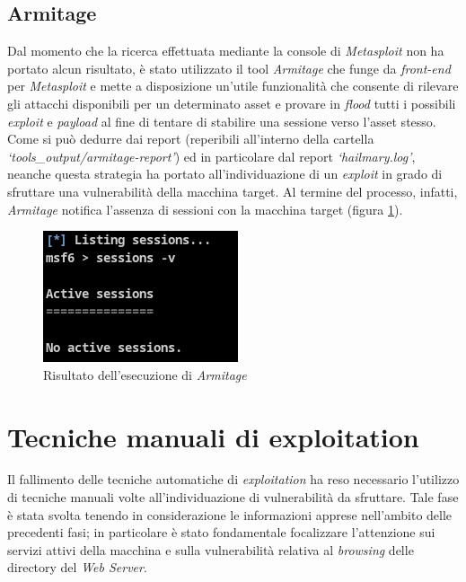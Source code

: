\subsection{Armitage}
Dal momento che la ricerca effettuata mediante la console di \emph{Metasploit} non ha portato alcun risultato, è stato utilizzato il tool \emph{Armitage} che funge da \emph{front-end} per \emph{Metasploit} e mette a disposizione un'utile funzionalità che consente di rilevare gli attacchi disponibili per un determinato asset e provare in \emph{flood} tutti i possibili \emph{exploit} e \emph{payload} al fine di tentare di stabilire una sessione verso l'asset stesso. Come si può dedurre dai report (reperibili all'interno della cartella \emph{`tools\_output/armitage-report'}) ed in particolare dal report \emph{`hailmary.log'}, neanche questa strategia ha portato all'individuazione di un \emph{exploit} in grado di sfruttare una vulnerabilità della macchina target. Al termine del processo, infatti, \emph{Armitage} notifica l'assenza di sessioni con la macchina target (figura \ref{fig:armitage}).
\begin{figure}[h]
    \centering
    \includegraphics[scale=1]{capitoli/images/armitage.png}
    \caption{Risultato dell'esecuzione di \emph{Armitage}}
    \label{fig:armitage}
\end{figure}
\section{Tecniche manuali di exploitation}
Il fallimento delle tecniche automatiche di \emph{exploitation} ha reso necessario l'utilizzo di tecniche manuali volte all'individuazione di vulnerabilità da sfruttare. Tale fase è stata svolta tenendo in considerazione le informazioni apprese nell'ambito delle precedenti fasi; in particolare è stato fondamentale focalizzare l'attenzione sui servizi attivi della macchina e sulla vulnerabilità relativa al \emph{browsing} delle directory del \emph{Web Server}. 

